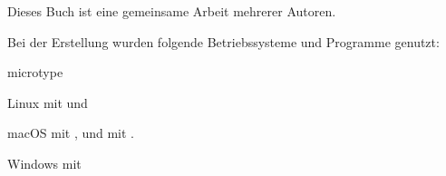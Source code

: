 



\listfiles


\frontmatter



\tableofcontents
\mainmatter




















\printbibliography




\vfill
{}

Dieses Buch ist eine gemeinsame Arbeit mehrerer Autoren.

Bei der Erstellung wurden folgende Betriebssysteme und Programme genutzt:

\begin{labeling}{microtype}
  \item[Linux] mit  und 
  \item[macOS] mit ,  und 
    mit .
  \item[Windows] mit 
\end{labeling}

